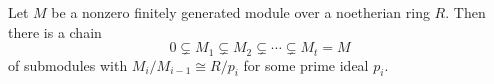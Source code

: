 Let $M$ be a nonzero finitely generated module over a noetherian ring $R$.
Then there is a chain
\[ 0 \subsetneq M_1 \subsetneq M_2 \subsetneq \cdots \subsetneq M_t = M \]
of submodules with $M_i/M_{i-1}\cong R/p_i$ for some prime ideal $p_i$.
